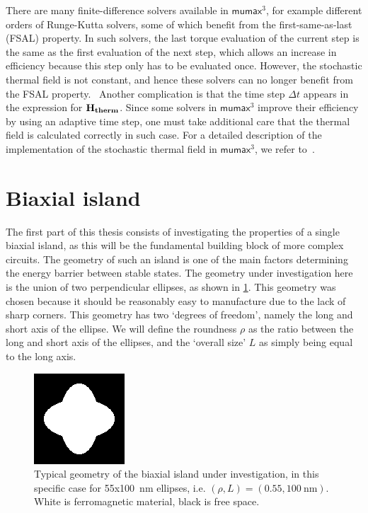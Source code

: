 \documentclass[10pt,a4paper]{article}
\newcommand{\mumax}{$\mathsf{mumax}^3$}
\begin{document}
There are many finite-difference solvers available in \mumax{}, for example different orders of Runge-Kutta solvers, some of which benefit from the first-same-as-last (FSAL) property. In such solvers, the last torque evaluation of the current step is the same as the first evaluation of the next step, which allows an increase in efficiency because this step only has to be evaluated once. However, the stochastic thermal field is not constant, and hence these solvers can no longer benefit from the FSAL property.~\cite{LEL-17b} Another complication is that the time step $\Delta t$ appears in the expression for $\vb{H_{therm}}$. Since some solvers in \mumax{} improve their efficiency by using an adaptive time step, one must take additional care that the thermal field is calculated correctly in such case. For a detailed description of the implementation of the stochastic thermal field in \mumax{}, we refer to~\cite{LEL-17b}.

\section{Biaxial island}
\label{par:Biaxial_island}
The first part of this thesis consists of investigating the properties of a single biaxial island, as this will be the fundamental building block of more complex circuits. The geometry of such an island is one of the main factors determining the energy barrier between stable states. The geometry under investigation here is the union of two perpendicular ellipses, as shown in \cref{fig:biaxial_island:geometryTypical}. This geometry was chosen because it should be reasonably easy to manufacture due to the lack of sharp corners. This geometry has two `degrees of freedom', namely the long and short axis of the ellipse. We will define the roundness $\rho$ as the ratio between the long and short axis of the ellipses, and the `overall size' $L$ as simply being equal to the long axis.
\begin{figure}
    \centering
    \includegraphics[width=0.3\columnwidth]{Figures/biaxial_island/Geometry/geomPlus55.png}
    \caption{Typical geometry of the biaxial island under investigation, in this specific case for 55x\SI{100}{\nano\metre} ellipses, i.e. $(\rho, L)=(0.55, \SI{100}{\nano\metre})$. White is ferromagnetic material, black is free space.}
    \label{fig:biaxial_island:geometryTypical}
\end{figure}
\end{document}
